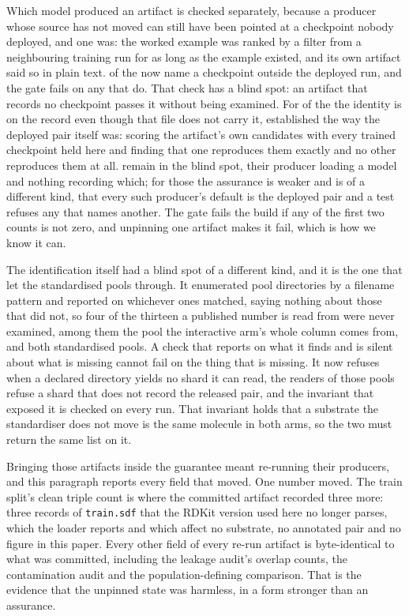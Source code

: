 \documentclass[journal=jcisd8,manuscript=suppinfo,layout=onecolumn]{achemso}
\begin{document}
Which model produced an artifact is checked separately, because a producer whose source has not
moved can still have been pointed at a checkpoint nobody deployed, and one was: the worked example
was ranked by a filter from a neighbouring training run for as long as the example existed, and its
own artifact said so in plain text. \numProvSourceswrongmodel{} of the \numProvSources{} now name
a checkpoint outside the deployed run, and the gate fails on any that do. That check has a blind
spot: an artifact that records no checkpoint passes it without being examined. For
\numProvSourcesestablishedWord{} of the \numProvSources{} the identity is on the record even
though that file does not carry it, established the way the deployed pair itself was: scoring the
artifact's own candidates with every trained checkpoint held here and finding that one reproduces
them exactly and no other reproduces them at all. \numProvSourcesnocheckpoint{} remain in the
blind spot, their producer loading a model and nothing recording which; for those the assurance is
weaker and is of a different kind, that every such producer's default is the deployed pair and a
test refuses any that names another. The gate fails the build
if any of the first two counts is not zero, and unpinning one artifact makes it fail, which is how
we know it can.

The identification itself had a blind spot of a different kind, and it is the one that let the
standardised pools through. It enumerated pool directories by a filename pattern and reported on
whichever ones matched, saying nothing about those that did not, so four of the thirteen a
published number is read from were never examined, among them the pool the interactive arm's
whole column comes from, and both standardised pools. A check that reports on what it finds and
is silent about what is missing cannot fail on the thing that is missing. It now refuses when a
declared directory yields no shard it can read, the readers of those pools refuse a shard that
does not record the released pair, and the invariant that exposed it is checked on every run.
That invariant holds that a substrate the standardiser does not move is the same molecule in both
arms, so the two must return the same list on it.

Bringing those artifacts inside the guarantee meant re-running their producers, and this paragraph
reports every field that moved. One number moved. The train split's clean triple
count is \numSplitTrainTriples{} where the committed artifact recorded three more: three records
of \texttt{train.sdf} that the RDKit version used here no longer parses, which the loader reports
and which affect no substrate, no annotated pair and no figure in this paper. Every other field of
every re-run artifact is byte-identical to what was committed, including the leakage audit's
overlap counts, the contamination audit and the population-defining comparison. That is the
evidence that the unpinned state was harmless, in a form stronger than an assurance.
\end{document}
